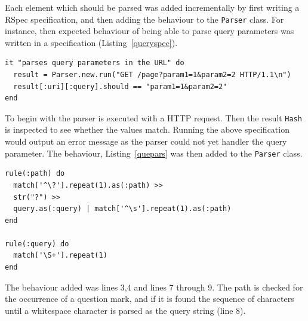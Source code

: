 Each element which should be parsed was added incrementally by first writing a
RSpec specification, and then adding the behaviour to the \texttt{Parser}
class. For instance, then expected behaviour of being able to parse query
parameters was written in a specification (Listing~\ref{queryspec}).

\bigskip
\begin{lstlisting}[label=queryspec,caption=Parser query parameter support specification (spec/yarn/parser\_spec.rb:54).]
it "parses query parameters in the URL" do
  result = Parser.new.run("GET /page?param1=1&param2=2 HTTP/1.1\n")
  result[:uri][:query].should == "param1=1&param2=2"
end
\end{lstlisting}

To begin with the parser is executed with a HTTP request. Then the result
\texttt{Hash} is inspected to see whether the values match. Running the above
specification would output an error message as the parser could not yet
handler the query parameter. The behaviour, Listing~\ref{quepars} was then
added to the \texttt{Parser} class.

\bigskip
\begin{lstlisting}[label=quepars,caption=URL query parameter support (lib/yarn/parser.rb:31).]
rule(:path) do 
  match['^\?'].repeat(1).as(:path) >> 
  str("?") >> 
  query.as(:query) | match['^\s'].repeat(1).as(:path)
end

rule(:query) do
  match['\S+'].repeat(1)
end
\end{lstlisting}

The behaviour added was lines 3,4 and lines 7 through 9. The path is checked
for the occurrence of a question mark, and if it is found the sequence of
characters until a whitespace character is parsed as the query string (line 8).


